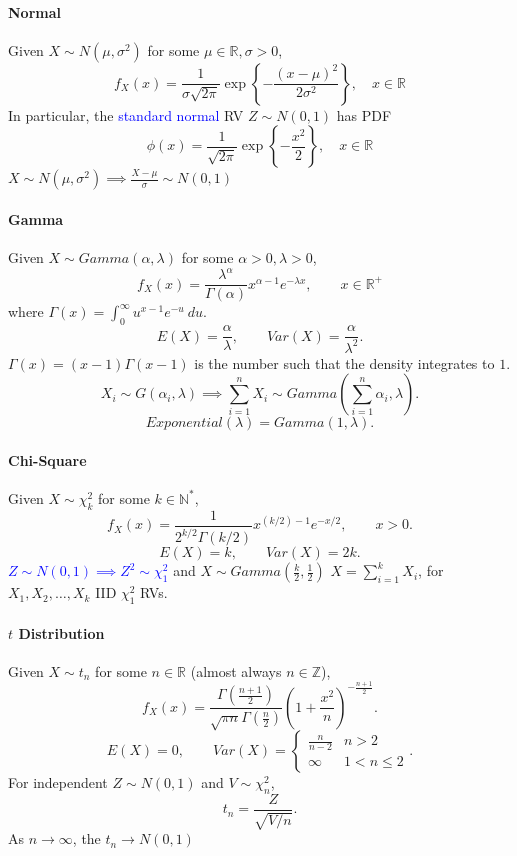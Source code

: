 \paragraph{Normal}
Given $X\sim N(\mu, \sigma^{2})$ for some $\mu\in \mathbb{R},\sigma>0$,
\[f_X(x)=\frac{1}{\sigma \sqrt{2\pi}}\exp{\left\{-\frac{{\left( x-\mu \right)
}^{2}}{2\sigma^{2}}\right\}},\quad x\in \mathbb{R}\]
In particular, the \textcolor{Blue}{standard normal} RV $Z\sim N(0,1)$ has PDF
\[\phi(x)=\frac{1}{\sqrt{2\pi}}\exp{\left\{-\frac{x^{2}}{2}\right\}},\quad x\in \mathbb{R}\]
$X\sim N(\mu, \sigma^{2})\implies \frac{X-\mu}{\sigma}\sim N(0,1)$

\paragraph{Gamma}
Given $X\sim Gamma(\alpha,\lambda)$ for some $\alpha>0,\lambda>0$,
\[f_X(x)=\frac{\lambda^{\alpha}}{\Gamma(\alpha)}x^{\alpha-1}e^{-\lambda x},\qquad x\in \mathbb{R}^{+}\]
where $\Gamma(x)=\int_{{0}}^{{\infty}} {u^{x-1}e^{-u}} \: d{u} {}$.
\[E(X)=\frac{\alpha}{\lambda},\qquad Var(X)=\frac{\alpha}{\lambda^{2}}.\] 
$\Gamma(x)=(x-1)\Gamma(x-1)$ is the number such that the density integrates to
$1$.
\[X_i\sim G(\alpha_i,\lambda)\implies \sum_{i=1}^{n} X_i \sim Gamma\left(\sum_{i=1}^{n} \alpha_i, \lambda\right).\] 
\[Exponential(\lambda)=Gamma(1,\lambda).\] 

\paragraph{Chi-Square}
Given $X\sim\chi^{2}_k$ for some $k\in \mathbb{N}^{*}$,
\[f_X(x)=\frac{1}{2^{{k}/2 }\Gamma\left( k/2 \right)}x^{\left( k/2 \right) -1}e^{-x/2},\qquad x>0.\] 
\[E(X)=k,\qquad Var(X)=2k.\] 
\textcolor{Blue}{$Z\sim N(0,1)\implies Z^{2}\sim\chi^{2}_1$} and $X\sim Gamma(\frac{k}{2},\frac{1}{2})$
$X=\sum_{i=1}^{k} X_i$, for $X_1,X_2,\ldots,X_k$ IID $\chi_1^{2}$ RVs.

\paragraph{$t$ Distribution}
Given $X\sim t_{n}$ for some $n\in \mathbb{R}$ (almost always $n\in \mathbb{Z}$),
\[f_X(x)=\frac{\Gamma\left( \frac{n+1}{2} \right) }{\sqrt{\pi n}\Gamma\left( \frac{n}{2} \right) }{\left( 1+\frac{x^{2}}{n} \right) }^{-\frac{n+1}{2}}.\] 
\[E(X)=0,\qquad Var(X)=\begin{cases}\frac{n}{n-2}&n>2\\\infty&1<n\le 2\end{cases}.\] 
For independent $Z\sim N(0,1)$ and $V\sim\chi_{n}^{2}$,
\[t_{n}=\frac{Z}{\sqrt{V/n}}.\] 
As $n\to \infty$, the $t_{n}\to N(0,1)$


